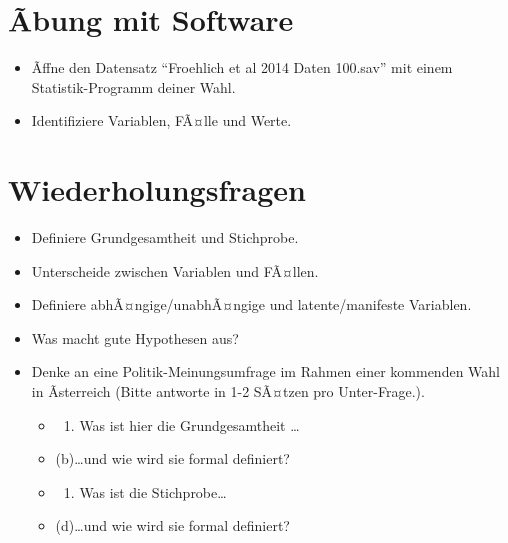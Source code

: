 \documentclass[
]{book}
\providecommand{\tightlist}{%
  \setlength{\itemsep}{0pt}\setlength{\parskip}{0pt}}
\begin{document}
\hypertarget{uxe3bung-mit-software}{%
\section{Ãbung mit Software}\label{uxe3bung-mit-software}}

\begin{itemize}
\tightlist
\item
  Ãffne den Datensatz ``Froehlich et al 2014 Daten 100.sav'' mit einem Statistik-Programm deiner Wahl.
\item
  Identifiziere Variablen, FÃ¤lle und Werte.
\end{itemize}

\hypertarget{wiederholungsfragen}{%
\section{Wiederholungsfragen}\label{wiederholungsfragen}}

\begin{itemize}
\tightlist
\item
  Definiere Grundgesamtheit und Stichprobe.
\item
  Unterscheide zwischen Variablen und FÃ¤llen.
\item
  Definiere abhÃ¤ngige/unabhÃ¤ngige und latente/manifeste Variablen.
\item
  Was macht gute Hypothesen aus?
\item
  Denke an eine Politik-Meinungsumfrage im Rahmen einer kommenden Wahl in Ãsterreich (Bitte antworte in 1-2 SÃ¤tzen pro Unter-Frage.).

  \begin{itemize}
  \item
    \begin{enumerate}
    \def\labelenumi{(\alph{enumi})}
    \tightlist
    \item
      Was ist hier die Grundgesamtheit \ldots{}
    \end{enumerate}
  \item
    (b)\ldots und wie wird sie formal definiert?
  \item
    \begin{enumerate}
    \def\labelenumi{(\alph{enumi})}
    \setcounter{enumi}{2}
    \tightlist
    \item
      Was ist die Stichprobe\ldots{}
    \end{enumerate}
  \item
    (d)\ldots und wie wird sie formal definiert?
  \end{itemize}
\end{itemize}
\end{document}
